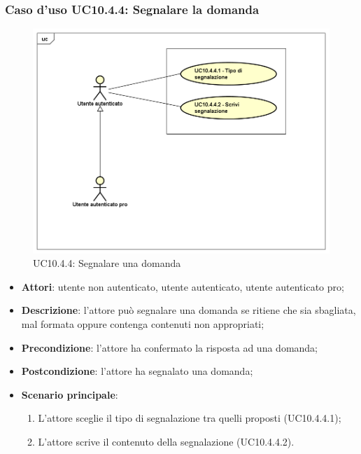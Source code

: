 \subsubsection{Caso d'uso UC10.4.4: Segnalare la domanda}
\label{UC10.4.4}
\begin{figure}
	\centering
	\includegraphics[scale=0.5]{UML/UC10_4_4.png}
	\caption{UC10.4.4: Segnalare una domanda}
\end{figure}
\FloatBarrier
	\begin{itemize}
		\item \textbf{Attori}: utente non autenticato, utente autenticato, utente autenticato pro;
		\item \textbf{Descrizione}: l'attore può segnalare una domanda se ritiene che sia sbagliata, mal formata oppure contenga contenuti non appropriati;
		\item \textbf{Precondizione}: l'attore ha confermato la risposta ad una domanda;
		\item \textbf{Postcondizione}: l'attore ha segnalato una domanda;
		\item \textbf{Scenario principale}:		
				\begin{enumerate}
					\item L'attore sceglie il tipo di segnalazione tra quelli proposti (UC10.4.4.1);
					\item L'attore scrive il contenuto della segnalazione (UC10.4.4.2).
				\end{enumerate}
	\end{itemize}
